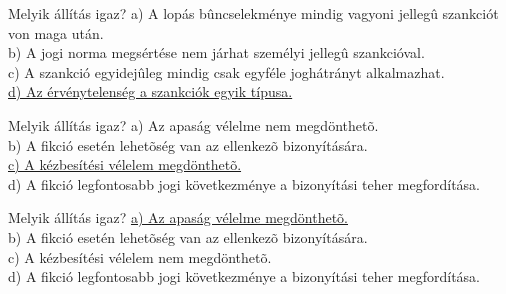 \begin{frame}

\begin{tcolorbox}[title={22. Kérdés}]
Melyik állítás igaz?
\tcblower
a) A lopás bûncselekménye mindig vagyoni jellegû szankciót von maga után.\\
b) A jogi norma megsértése nem járhat személyi jellegû szankcióval.\\
c) A szankció egyidejûleg mindig csak egyféle joghátrányt alkalmazhat.\\
\uline {d) Az érvénytelenség a szankciók egyik típusa.}
\end{tcolorbox}

\begin{tcolorbox}[title={23. Kérdés}]
Melyik állítás igaz?
\tcblower
a) Az apaság vélelme nem megdönthetõ.\\
b) A fikció esetén lehetõség van az ellenkezõ bizonyítására.\\
\uline {c) A kézbesítési vélelem megdönthetõ.}\\
d) A fikció legfontosabb jogi következménye a bizonyítási teher megfordítása.
\end{tcolorbox}

\begin{tcolorbox}[title={24. Kérdés}]
Melyik állítás igaz?
\tcblower
\uline {a) Az apaság vélelme megdönthetõ.}\\
b) A fikció esetén lehetõség van az ellenkezõ bizonyítására.\\
c) A kézbesítési vélelem nem megdönthetõ.\\
d) A fikció legfontosabb jogi következménye a bizonyítási teher megfordítása.
\end{tcolorbox}

\end{frame}


